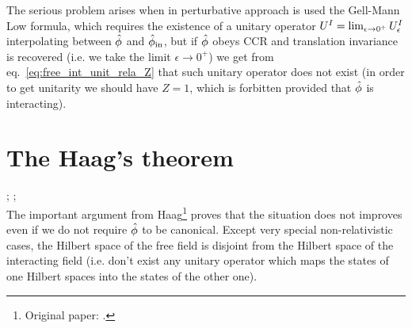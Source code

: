 \documentclass[../main/main.tex]{subfiles}
\begin{document}
The serious problem arises when in perturbative approach is used the Gell-Mann Low formula, which requires the existence of a unitary operator $U^I=\lim_{\epsilon\to0^+}\uei$ interpolating between $\hat{\phi}$ and $\hat{\phi}_{\text{in}}$, but if $\hat{\phi}$ obeys CCR and translation invariance is recovered (i.e. we take the limit $\epsilon\to0^+$) we get from eq.~\eqref{eq:free_int_unit_rela_Z}  that such unitary operator does not exist (in order to get unitarity we should have $Z=1$, which is forbitten provided that $\hat{\phi}$ is interacting).

\section{The Haag's theorem}

\cite[Section 3]{Earman:2005}; \cite[Section 4.5]{Raymond-F.-Streater:1964}; \cite[Pages 39-40, 95-96]{Strocchi_2013}\\

The important argument from Haag\footnote{Original paper: \cite{Haag:1955}.} proves that the situation does not improves even if we do not require $\hat{\phi}$ to be canonical. Except very special non-relativistic cases, the Hilbert space of the free field is disjoint from the Hilbert space of the interacting field (i.e. don't exist any unitary operator which maps the states of one Hilbert spaces into the states of the other one). 
\end{document}
